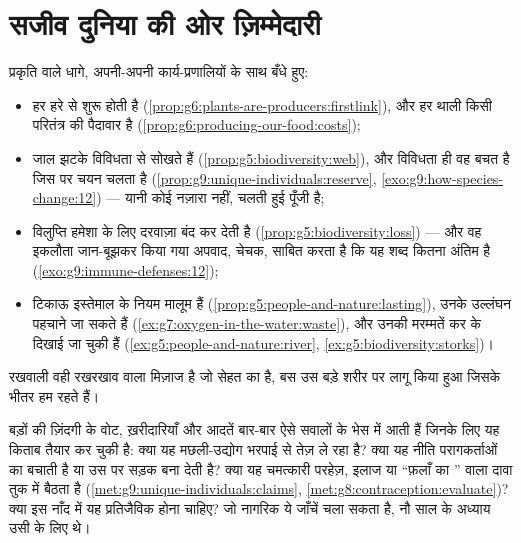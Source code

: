 \section{सजीव दुनिया की ओर ज़िम्मेदारी}

\begin{proposition}\label{prop:g9:our-responsibility:stewardship}
प्रकृति वाले धागे, अपनी-अपनी कार्य-प्रणालियों के साथ बँधे हुए:
\begin{itemize}
  \item हर  हरे से शुरू होती है
        (\cref{prop:g6:plants-are-producers:firstlink}), और हर थाली
        किसी परितंत्र की पैदावार है
        (\cref{prop:g6:producing-our-food:costs});
  \item जाल झटके विविधता से सोखते हैं
        (\cref{prop:g5:biodiversity:web}), और विविधता ही वह बचत है
        जिस पर चयन चलता है
        (\cref{prop:g9:unique-individuals:reserve},
        \cref{exo:g9:how-species-change:12}) --- यानी  कोई
        नज़ारा नहीं, चलती हुई पूँजी है;
  \item विलुप्ति हमेशा के लिए दरवाज़ा बंद कर देती है
        (\cref{prop:g5:biodiversity:loss}) --- और वह इकलौता
        जान-बूझकर किया गया अपवाद, चेचक, साबित करता है कि यह शब्द कितना
        अंतिम है (\cref{exo:g9:immune-defenses:12});
  \item टिकाऊ इस्तेमाल के नियम मालूम हैं
        (\cref{prop:g5:people-and-nature:lasting}), उनके उल्लंघन
        पहचाने जा सकते हैं
        (\cref{ex:g7:oxygen-in-the-water:waste}), और उनकी मरम्मतें कर
        के दिखाई जा चुकी हैं
        (\cref{ex:g5:people-and-nature:river},
        \cref{ex:g5:biodiversity:storks})।
\end{itemize}
रखवाली वही रखरखाव वाला मिज़ाज है जो सेहत का है, बस उस बड़े शरीर पर लागू
किया हुआ जिसके भीतर हम रहते हैं।
\end{proposition}
\admitted

\begin{example}[किसी नागरिक का जीव विज्ञान किसलिए है]\label{ex:g9:our-responsibility:citizen}
बड़ों की ज़िंदगी के वोट, ख़रीदारियाँ और आदतें बार-बार ऐसे सवालों के भेस
में आती हैं जिनके लिए यह किताब तैयार कर चुकी है: क्या यह मछली-उद्योग
भरपाई से तेज़ ले रहा है? क्या यह नीति परागकर्ताओं का  बचाती है या उस
पर सड़क बना देती है? क्या यह चमत्कारी परहेज़, इलाज या ``फ़लाँ का ''
वाला दावा तुक में बैठता है
(\cref{met:g9:unique-individuals:claims},
\cref{met:g8:contraception:evaluate})? क्या इस नाँद में यह प्रतिजैविक
होना चाहिए? जो नागरिक ये जाँचें चला सकता है, नौ साल के अध्याय उसी के लिए
थे।
\end{example}

